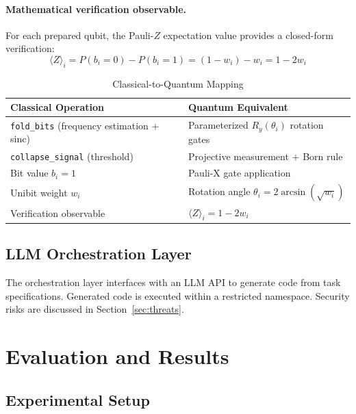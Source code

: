 ﻿\documentclass[12pt,a4paper]{article}
\begin{document}
\paragraph{Mathematical verification observable.} For each prepared qubit, the Pauli-$Z$ expectation value provides a closed-form verification:
\begin{equation}
    \langle Z \rangle_i = P(b_i = 0) - P(b_i = 1) = (1 - w_i) - w_i = 1 - 2w_i
\end{equation}

\begin{table}[H]
\centering
\caption{Classical-to-Quantum Mapping}
\label{tab:mapping}
\small
\begin{tabular}{@{}ll@{}}
\toprule
\textbf{Classical Operation} & \textbf{Quantum Equivalent} \\
\midrule
\texttt{fold\_bits} (frequency estimation + sinc) & Parameterized $R_y(\theta_i)$ rotation gates \\
\texttt{collapse\_signal} (threshold) & Projective measurement + Born rule \\
Bit value $b_i = 1$ & Pauli-X gate application \\
Unibit weight $w_i$ & Rotation angle $\theta_i = 2\arcsin(\sqrt{w_i})$ \\
Verification observable & $\langle Z \rangle_i = 1 - 2w_i$ \\
\bottomrule
\end{tabular}
\end{table}

\subsection{LLM Orchestration Layer}

The orchestration layer interfaces with an LLM API to generate code from task specifications. Generated code is executed within a restricted namespace. Security risks are discussed in Section~\ref{sec:threats}.


\section{Evaluation and Results}\label{sec:evaluation}

\subsection{Experimental Setup}
\end{document}

